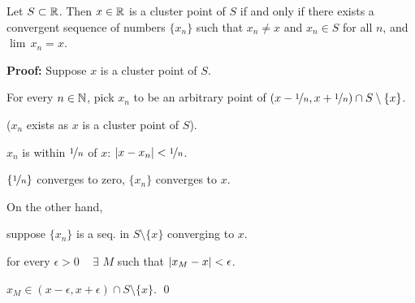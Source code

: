 \documentclass[10pt,aspectratio=169]{beamer}
\begin{document}
\begin{frame}

\begin{proposition}
Let $S \subset {\mathbb{R}}$.  Then $x \in {\mathbb{R}}$ is a cluster point of $S$
if and only if
there exists a convergent sequence of numbers $\{ x_n \}$ such that
$x_n \not= x$ and $x_n \in S$ for all $n$, and $\lim\, x_n = x$.
\end{proposition}

\pause
\textbf{Proof:}
Suppose $x$ is a cluster point of $S$.

\pause

For every $n \in {\mathbb{N}}$, pick $x_n$ to be an arbitrary point of
$(x-\nicefrac{1}{n},x+\nicefrac{1}{n}) \cap S \setminus \{x\}$.

($x_n$ exists as $x$ is a cluster point of $S$).

\pause

$x_n$ is within $\nicefrac{1}{n}$ of $x$: \quad
$\left\lvert {x-x_n} \right\rvert < \nicefrac{1}{n}$.


\pause

$\{ \nicefrac{1}{n} \}$ converges to zero, $\{ x_n \}$ converges to $x$.

\pause
\medskip

On the other hand, 

suppose $\{ x_n \}$ is a seq. in $S \setminus \{ x \}$ converging to $x$.

\pause
\thus \quad
for every $\epsilon > 0$ ~ $\exists$ $M$ such that $\left\lvert {x_M - x} \right\rvert < \epsilon$.

\pause
\thus \quad $x_M \in (x-\epsilon,x+\epsilon) \cap S \setminus \{x\}$.
\qed

\end{frame}
\end{document}

